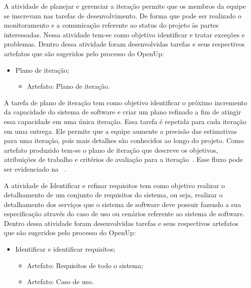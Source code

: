 A atividade de planejar e gerenciar a iteração permite que os membros da equipe se inscrevam nas tarefas de desenvolvimento. De forma que pode ser realizado o monitoramento e a comunicação referente ao status do projeto às partes interessadas. Nessa atividade tem-se como objetivo identificar e tratar exceções e problemas. Dentro dessa atividade foram desenvolvidas tarefas e seus respectivos artefatos que são sugeridos pelo processo do \acrfull{OpenUp}:

\begin{itemize}
    \item Plano de iteração;
        \begin{itemize}
            \item Artefato: Plano de iteração.
        \end{itemize}
\end{itemize}

%

A tarefa de plano de iteração tem como objetivo identificar o próximo incremento da capacidade do sistema de software e criar um plano refinado a fim de atingir essa capacidade em uma única iteração. Essa tarefa é repetida para cada iteração em uma entrega. Ele permite que a equipe aumente a precisão das estimativas para uma iteração, pois mais detalhes são conhecidos ao longo do projeto. Como artefato produzido tem-se  o plano de iteração que descreve os objetivos, atribuições de trabalho e critérios de avaliação para a iteração~\cite{openup}. Esse fluxo pode ser evidenciado na ~.


A atividade de Identificar e refinar requisitos tem como objetivo realizar o detalhamento de um conjunto de requisitos do sistema, ou seja, realizar o detalhamento dos serviços que o sistema de software deve possuir fazendo a sua especificação através do caso de uso ou cenários referente ao sistema de software. Dentro dessa atividade foram desenvolvidas tarefas e seus respectivos artefatos que são sugeridos pelo processo do \acrfull{OpenUp}:

\begin{itemize}
    \item Identificar e identificar requisitos;
        \begin{itemize}
            \item Artefato: Requisitos de todo o sistema;
            \item Artefato: Caso de uso.
        \end{itemize}
\end{itemize}

